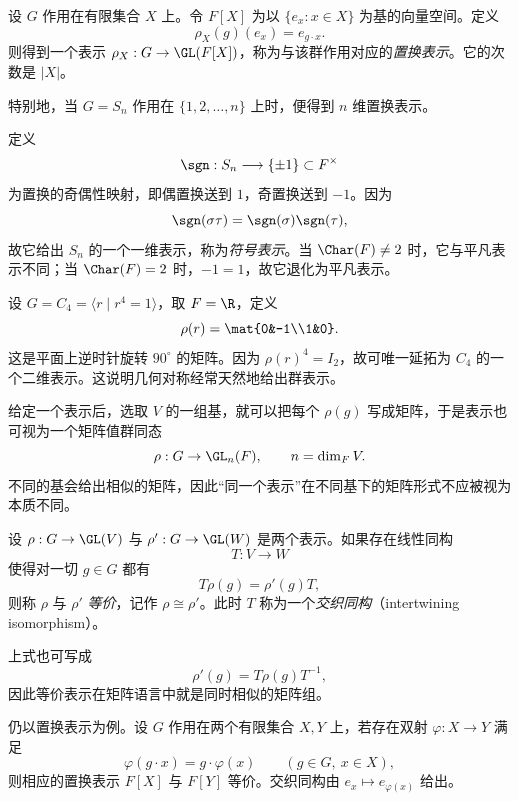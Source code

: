 \begin{example}[置换表示]
设 $G$ 作用在有限集合 $X$ 上。令 $F[X]$ 为以 $\{e_x:x\in X\}$ 为基的向量空间。定义
\[
\rho_X(g)(e_x)=e_{g\cdot x}.
\]
则得到一个表示 $\rho_X:G\to \GL(F[X])$，称为与该群作用对应的\emph{置换表示}。它的次数是 $|X|$。

特别地，当 $G=S_n$ 作用在 $\{1,2,\dots,n\}$ 上时，便得到 $n$ 维置换表示。
\end{example}

\begin{example}[$S_n$ 的符号表示]
定义
\[
\sgn:S_n\longrightarrow \{\pm 1\}\subset F^{\times}
\]
为置换的奇偶性映射，即偶置换送到 $1$，奇置换送到 $-1$。因为
\[
\sgn(\sigma\tau)=\sgn(\sigma)\sgn(\tau),
\]
故它给出 $S_n$ 的一个一维表示，称为\emph{符号表示}。当 $\Char(F)\neq 2$ 时，它与平凡表示不同；当 $\Char(F)=2$ 时，$-1=1$，故它退化为平凡表示。
\end{example}

\begin{example}[循环群的二维表示]
设 $G=C_4=\langle r\mid r^4=1\rangle$，取 $F=\R$，定义
\[
\rho(r)=\mat{0&-1\\1&0}.
\]
这是平面上逆时针旋转 $90^\circ$ 的矩阵。因为 $\rho(r)^4=I_2$，故可唯一延拓为 $C_4$ 的一个二维表示。这说明几何对称经常天然地给出群表示。
\end{example}

给定一个表示后，选取 $V$ 的一组基，就可以把每个 $\rho(g)$ 写成矩阵，于是表示也可视为一个矩阵值群同态
\[
\rho:G\to \GL_n(F),\qquad n=\dim_F V.
\]
不同的基会给出相似的矩阵，因此“同一个表示”在不同基下的矩阵形式不应被视为本质不同。

\begin{definition}
设 $\rho:G\to \GL(V)$ 与 $\rho':G\to \GL(W)$ 是两个表示。如果存在线性同构
\[
T:V\longrightarrow W
\]
使得对一切 $g\in G$ 都有
\[
T\rho(g)=\rho'(g)T,
\]
则称 $\rho$ 与 $\rho'$ \emph{等价}，记作 $\rho\cong \rho'$。此时 $T$ 称为一个\emph{交织同构}（intertwining isomorphism）。
\end{definition}

上式也可写成
\[
\rho'(g)=T\rho(g)T^{-1},
\]
因此等价表示在矩阵语言中就是同时相似的矩阵组。

\begin{example}
仍以置换表示为例。设 $G$ 作用在两个有限集合 $X,Y$ 上，若存在双射 $\varphi:X\to Y$ 满足
\[
\varphi(g\cdot x)=g\cdot \varphi(x)
\qquad (g\in G,\ x\in X),
\]
则相应的置换表示 $F[X]$ 与 $F[Y]$ 等价。交织同构由 $e_x\mapsto e_{\varphi(x)}$ 给出。
\end{example}

